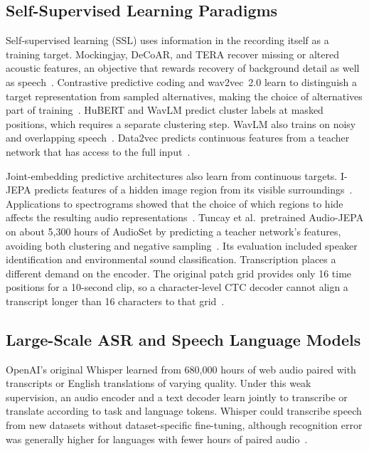 \documentclass[conference]{IEEEtran}
\begin{document}
\subsection{Self-Supervised Learning Paradigms}
Self-supervised learning (SSL) uses information in the recording itself as a training target. Mockingjay, DeCoAR, and TERA recover missing or altered acoustic features, an objective that rewards recovery of background detail as well as speech~\cite{liu2020mockingjay,ling2020decoar,liu2021tera}. Contrastive predictive coding and wav2vec~2.0 learn to distinguish a target representation from sampled alternatives, making the choice of alternatives part of training~\cite{oord2018cpc,baevski2020wav2vec2}. HuBERT and WavLM predict cluster labels at masked positions, which requires a separate clustering step. WavLM also trains on noisy and overlapping speech~\cite{hsu2021hubert,chen2022wavlm}. Data2vec predicts continuous features from a teacher network that has access to the full input~\cite{baevski2022data2vec}.

Joint-embedding predictive architectures also learn from continuous targets. I-JEPA predicts features of a hidden image region from its visible surroundings~\cite{assran2023ijepa}. Applications to spectrograms showed that the choice of which regions to hide affects the resulting audio representations~\cite{fei2023ajepa,riou2024audiojepa}. Tuncay et al.\ pretrained Audio-JEPA on about 5{,}300 hours of AudioSet by predicting a teacher network's features, avoiding both clustering and negative sampling~\cite{tuncay2025audiojepa}. Its evaluation included speaker identification and environmental sound classification. Transcription places a different demand on the encoder. The original patch grid provides only 16 time positions for a 10-second clip, so a character-level CTC decoder cannot align a transcript longer than 16 characters to that grid~\cite{tuncay2025audiojepa,graves2006ctc}.

\subsection{Large-Scale ASR and Speech Language Models}
OpenAI's original Whisper learned from 680{,}000 hours of web audio paired with transcripts or English translations of varying quality. Under this weak supervision, an audio encoder and a text decoder learn jointly to transcribe or translate according to task and language tokens. Whisper could transcribe speech from new datasets without dataset-specific fine-tuning, although recognition error was generally higher for languages with fewer hours of paired audio~\cite{radford2023whisper}.
\end{document}
